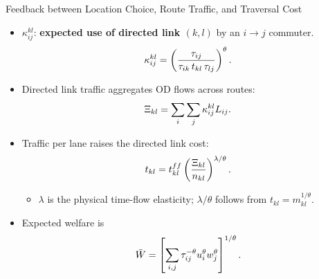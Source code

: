 \documentclass[11pt,aspectratio=169]{beamer}
\begin{document}
\begin{frame}{Feedback between Location Choice, Route Traffic, and Traversal Cost}
\begin{itemize}\footnotesize
  \item $\kappa^{kl}_{ij}$: \textbf{expected use of directed link $(k,l)$} by an $i\to j$ commuter.
  \vspace{-0.8em}\begin{equation}
    \kappa^{kl}_{ij}=\left(\frac{\tau_{ij}}{\tau_{ik}\,t_{kl}\,\tau_{lj}}\right)^\theta.
  \vspace{-0.6em}\end{equation}
  \item Directed link traffic aggregates OD flows across routes:
  \vspace{-0.5em}\begin{equation}\label{eq:Xi_c}
    \Xi_{kl}=\sum_i\sum_j\kappa^{kl}_{ij}L_{ij}.
  \vspace{-0.6em}\end{equation}
  \item Traffic per lane raises the directed link cost:
  \vspace{-0.5em}\begin{equation}\label{eq:c_Xi}
    t_{kl}=t_{kl}^{ff}\left(\frac{\Xi_{kl}}{n_{kl}}\right)^{\lambda/\theta}.
  \vspace{-0.6em}\end{equation}
  \begin{itemize}\scriptsize
    \item $\lambda$ is the physical time-flow elasticity; $\lambda/\theta$ follows from $t_{kl}=m_{kl}^{1/\theta}$.
  \end{itemize}
  \item Expected welfare is
  \vspace{-0.5em}\begin{equation}
    \bar W=\left[\sum_{i,j}\tau_{ij}^{-\theta}u_i^\theta w_j^\theta\right]^{1/\theta}.
  \vspace{-0.8em}\end{equation}
\end{itemize}
\end{frame}
\end{document}
